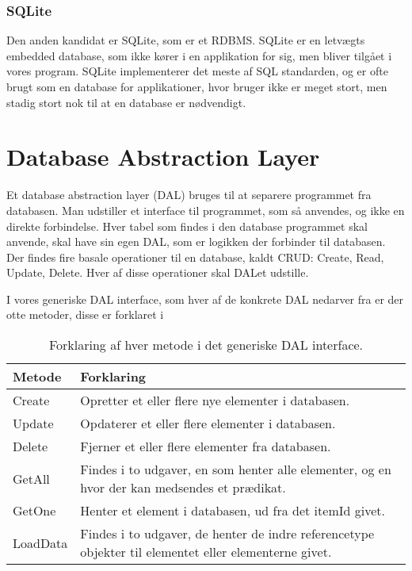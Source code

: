 \subsubsection*{SQLite}
Den anden kandidat er SQLite, som er et \ac{RDBMS}.
SQLite er en letvægts embedded database, som ikke kører i en applikation for sig, men bliver tilgået i vores program.
SQLite implementerer det meste af SQL standarden, og er ofte brugt som en database for applikationer, hvor bruger ikke er meget stort, men stadig stort nok til at en database er nødvendigt.


\section{Database Abstraction Layer}
Et database abstraction layer (DAL) bruges til at separere programmet fra databasen.
Man udstiller et interface til programmet, som så anvendes, og ikke en direkte forbindelse.
Hver tabel som findes i den database programmet skal anvende, skal have sin egen DAL, som er logikken der forbinder til databasen.
Der findes fire basale operationer til en database, kaldt CRUD: Create, Read, Update, Delete. 
Hver af disse operationer skal DALet udstille. 

I vores generiske DAL interface, som hver af de konkrete DAL nedarver fra er der otte metoder, disse er forklaret i 

\begin{table}[h]
    \begin{tabular}{p{2cm}|p{13cm}}
    \textbf{Metode}   & \textbf{Forklaring}       \\ \hline
    Create   & Opretter et eller flere nye elementer i databasen.                                                    \\ \hline
    Update   & Opdaterer et eller flere elementer i databasen.                                                       \\ \hline
    Delete   & Fjerner et eller flere elementer fra databasen.                                                       \\ \hline
    GetAll   & Findes i to udgaver, en som henter alle elementer, og en hvor der kan medsendes et prædikat.          \\ \hline
    GetOne   & Henter et element i databasen, ud fra det itemId givet.                                               \\ \hline
    LoadData & Findes i to udgaver, de henter de indre referencetype objekter til elementet eller elementerne givet. \\ \hline
    \end{tabular}
    \caption{Forklaring af hver metode i det generiske DAL interface.}
    \label{tab:ourExtCrud}
\end{table}

